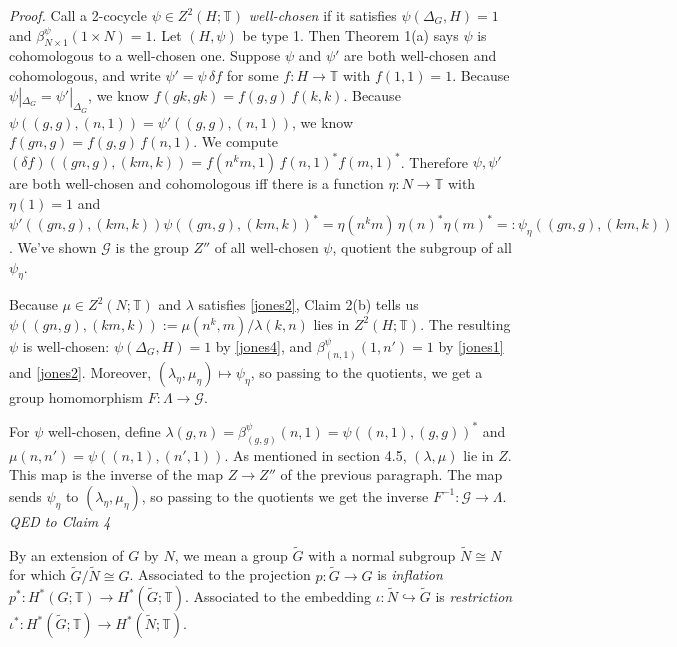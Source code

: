 \documentclass[12pt]{article}
\numberwithin{equation}{section}
\def\cG            {{\mathcal{G}}}
\def\bbT           {\mathbb{T}}
\begin{document}
\noindent\textit{Proof.} Call a 2-cocycle $\psi\in Z^2(H;\bbT)$ \textit{well-chosen} if it satisfies $\psi(\Delta_G,H)=1$ and $\beta^\psi_{N\times 1}(1\times N)=1$. Let $(H,\psi)$ be type 1. Then Theorem 1(a) says $\psi$ is cohomologous to a well-chosen one. Suppose 
$\psi$ and $\psi'$ are both well-chosen and cohomologous, and write $\psi'=\psi \,\delta f$ for some $f:H\rightarrow\bbT$ with $f(1,1)=1$. Because $\psi|_{\Delta_G}=\psi'|_{\Delta_G}$, we know
$f(gk,gk)=f(g,g)\,f(k,k)$. Because $\psi((g,g),(n,1))=\psi'((g,g),(n,1))$, we know $f(gn,g)=f(g,g)\,f(n,1)$.
We compute $(\delta f)((gn,g),(km,k))=f(n^km,1)\,f(n,1)^*f(m,1)^*$. Therefore $\psi,\psi'$ are both well-chosen and cohomologous iff there is a function $\eta:N\rightarrow\bbT$ with $\eta(1)=1$ and
$\psi'((gn,g),(km,k))\psi((gn,g),(km,k))^*=\eta(n^km)\,\eta(n)^*\eta(m)^*=:\psi_\eta((gn,g),(km,k))$. We've shown $\cG$ is the group $Z''$ of all well-chosen $\psi$, quotient the subgroup of all $\psi_\eta$.


Because $\mu\in Z^2(N;\bbT)$ and $\lambda$ satisfies \eqref{jones2}, Claim 2(b) tells us $\psi((gn,g),(km,k)):=\mu(n^k,m)/\lambda(k,n)$ lies in $Z^2(H;\bbT)$. The resulting $\psi$ is well-chosen: $\psi(\Delta_G,H)=1$ by \eqref{jones4}, and $\beta^\psi_{(n,1)}(1,n')=1$ by \eqref{jones1} and \eqref{jones2}. Moreover, $(\lambda_\eta,\mu_\eta)\mapsto \psi_\eta$, so passing to the quotients, we get a group homomorphism $F:\Lambda\rightarrow\cG$.
 
For $\psi$ well-chosen, define $\lambda(g,n)=\beta^\psi_{(g,g)}(n,1)=\psi((n,1),(g,g))^*$ and $\mu(n,n')=\psi((n,1),(n',1))$. As mentioned in section 4.5, $(\lambda,\mu)$ lie in $Z$.
 This map is the inverse of the map $Z\rightarrow Z''$ of the previous paragraph.
 The map sends $\psi_\eta$ to $(\lambda_\eta,\mu_\eta)$, so passing to the quotients we get the inverse $F^{-1}:\cG\rightarrow\Lambda$.  \textit{QED to Claim 4}\medskip



By an extension of $G$ by $N$, we mean a group $\widetilde{G}$ with a normal subgroup $\widetilde{N}\cong N$ for which $\widetilde{G}/\widetilde{N}\cong G$. Associated to the projection $p:\widetilde{G}\rightarrow G$ is \textit{inflation} $p^*:H^*(G;\bbT)\rightarrow H^*(\widetilde{G};\bbT)$. Associated to the embedding $\iota:\widetilde{N}\hookrightarrow 
\widetilde{G}$ is \textit{restriction} $\iota^*:H^*(\widetilde{G};\bbT)\rightarrow H^*(\widetilde{N};\bbT)$.
 
\end{document}
